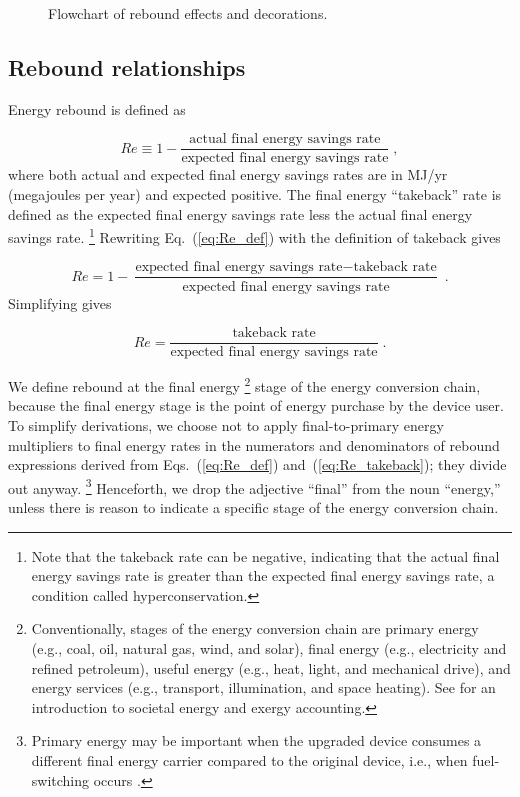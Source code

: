 \documentclass[12pt]{article}\usepackage[]{graphicx}\usepackage[]{xcolor}
\begin{document}
\begin{figure}
\centering
  
\caption{Flowchart of rebound effects and decorations.}
\label{fig:flowchart}
\end{figure}


\subsection{Rebound relationships}
\label{sec:rebound_relationships}

Energy rebound is defined as

\begin{equation} \label{eq:Re_def}
  Re \equiv 1 - \frac{\text{actual final energy savings rate}}{\text{expected final energy savings rate}} \; ,
\end{equation}
%
where both actual and expected final energy savings rates are in MJ/yr (megajoules per year)
and expected positive.
The final energy ``takeback'' rate is defined as the expected final energy savings rate less 
the actual final energy savings rate.%
\footnote{
  Note that the takeback rate can be negative, 
  indicating that the actual final energy savings rate
  is greater than the expected final energy savings rate, 
  a condition called hyperconservation.
}
%
Rewriting Eq.~(\ref{eq:Re_def}) with the definition of takeback gives

\begin{equation}
  Re = 1 - \frac{\text{expected final energy savings rate} - \text{takeback rate}}{\text{expected final energy savings rate}} \; .
\end{equation}
%
Simplifying gives

\begin{equation} \label{eq:Re_takeback}
  Re = \frac{\text{takeback rate}}{\text{expected final energy savings rate}} \; .
\end{equation}

We define rebound at the final energy%
\footnote{
  Conventionally, stages of the energy conversion chain are 
  primary energy (e.g., coal, oil, natural gas, wind, and solar),
  final energy (e.g., electricity and refined petroleum),  
  useful energy (e.g., heat, light, and mechanical drive), and 
  energy services (e.g., transport, illumination, and space heating).
  See \citet{Sousa:2017} for an introduction
  to societal energy and exergy accounting.
}
%
stage of the energy conversion chain,
because the final energy stage is
the point of energy purchase by the device user.
To simplify derivations, 
we choose not to apply final-to-primary energy multipliers
to final energy rates in the numerators and denominators of rebound expressions
derived from Eqs.~(\ref{eq:Re_def}) and~(\ref{eq:Re_takeback});
they divide out anyway.%
\footnote{
  Primary energy may be important when the upgraded device consumes a different 
  final energy carrier
  compared to the original device, 
  i.e., when fuel-switching occurs \citep{Chan2015}.
}
%
Henceforth, we drop the adjective ``final'' 
from the noun ``energy,''
unless there is reason to indicate a specific stage of the energy conversion chain.
\end{document}

